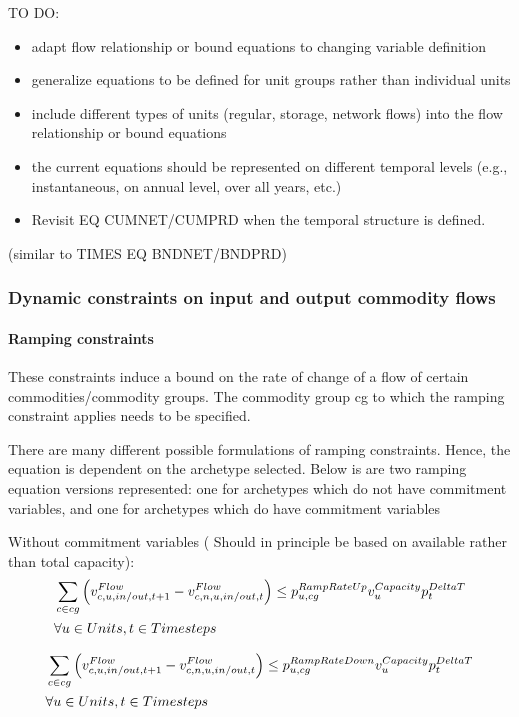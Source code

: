 {\color{red}
TO DO:
\begin{itemize}
	\item adapt flow relationship or bound equations to changing variable definition
	\item generalize equations to be defined for unit groups rather than individual units
	\item include different types of units (regular, storage, network flows) into the flow relationship or bound equations
	\item the current equations should be represented on different temporal levels (e.g., instantaneous, on annual level, over all years, etc.)
	\item Revisit EQ CUMNET/CUMPRD when the temporal structure is defined.
\end{itemize}
}

(similar to TIMES EQ BNDNET/BNDPRD)





\subsubsection{Dynamic constraints on input and output commodity flows}
\paragraph{Ramping constraints} These constraints induce a bound on the rate of change of a flow of certain commodities/commodity groups. The commodity group cg to which the ramping constraint applies needs to be specified.

There are many different possible formulations of ramping constraints. Hence, the equation is dependent on the archetype selected. Below is are two ramping equation versions represented: one for archetypes which do not have commitment variables, and one for archetypes which do have commitment variables

Without commitment variables ({\color{red} Should in principle be based on available rather than total capacity}):
\begin{align} \label{eq:updwardrampingconstraintwithoutcommitmentvariables}
&\sum_{\commodity \in cg} \Big( \vFlow[\commodity,\unit,in/out,\timestep+1] - \vFlow \Big) \le \pRampRateUp \vCapacity \pDeltaT \nonumber \\
&\forall \units, \timesteps
\end{align}

\begin{align} \label{eq:downdwardrampingconstraintwithoutcommitmentvariables}
&\sum_{\commodity \in cg} \Big( \vFlow[\commodity,\unit,in/out,\timestep+1] - \vFlow \Big) \le \pRampRateDown \vCapacity \pDeltaT\nonumber \\
& \forall \units, \timesteps
\end{align}



